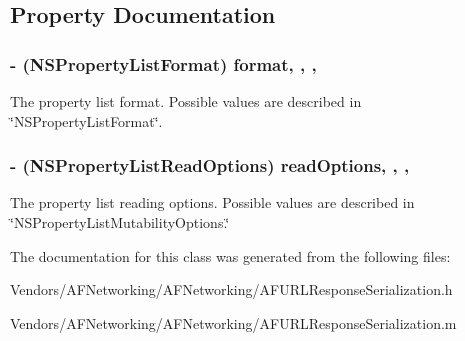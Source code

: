 \subsection{Property Documentation}
\hypertarget{interface_a_f_property_list_response_serializer_a616f88e89a24ca953c50e40f85177293}{}
\subsubsection[{format}]{\setlength{\rightskip}{0pt plus 5cm}-\/ (N\+S\+Property\+List\+Format) format\hspace{0.3cm}{\ttfamily [read]}, {\ttfamily [write]}, {\ttfamily [nonatomic]}, {\ttfamily [assign]}}\label{interface_a_f_property_list_response_serializer_a616f88e89a24ca953c50e40f85177293}
The property list format. Possible values are described in \char`\"{}\+N\+S\+Property\+List\+Format\char`\"{}. \hypertarget{interface_a_f_property_list_response_serializer_a6913e8c365408a0800eb08b5396522f0}{}
\subsubsection[{read\+Options}]{\setlength{\rightskip}{0pt plus 5cm}-\/ (N\+S\+Property\+List\+Read\+Options) read\+Options\hspace{0.3cm}{\ttfamily [read]}, {\ttfamily [write]}, {\ttfamily [nonatomic]}, {\ttfamily [assign]}}\label{interface_a_f_property_list_response_serializer_a6913e8c365408a0800eb08b5396522f0}
The property list reading options. Possible values are described in \char`\"{}\+N\+S\+Property\+List\+Mutability\+Options.\char`\"{} 

The documentation for this class was generated from the following files\+:\begin{DoxyCompactItemize}
\item 
Vendors/\+A\+F\+Networking/\+A\+F\+Networking/A\+F\+U\+R\+L\+Response\+Serialization.\+h\item 
Vendors/\+A\+F\+Networking/\+A\+F\+Networking/A\+F\+U\+R\+L\+Response\+Serialization.\+m\end{DoxyCompactItemize}
